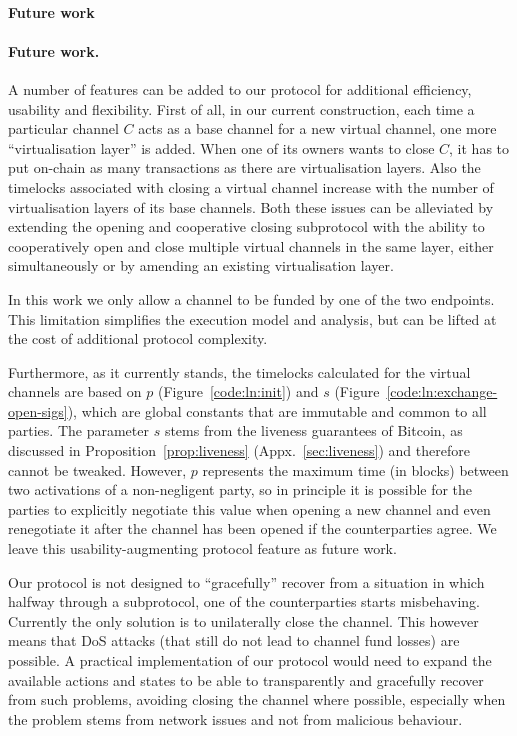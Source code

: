 \makeatletter%
%
  {\paragraph{Future work}}%
  {\paragraph{Future work.}}%
\makeatother%
  A number of features can be added to our protocol for additional efficiency,
  usability and flexibility. First of all, in our current construction, each
  time a particular channel $C$ acts as a base
  channel for a new virtual channel, one more ``virtualisation layer'' is added. When
  one of its owners wants to close $C$, it has to put on-chain as many
  transactions as there are virtualisation layers. Also the timelocks associated
  with closing a virtual channel increase with the number of virtualisation
  layers of its base channels. Both these issues can be alleviated by extending
  the opening and cooperative closing subprotocol with the ability to
  cooperatively open and close multiple virtual channels in the same layer,
  either simultaneously or by amending an existing virtualisation layer.

  In this work we only allow a channel to be funded by one of the two endpoints.
  This limitation simplifies the execution model and analysis, but can be lifted
  at the cost of additional protocol complexity.

  Furthermore, as it currently stands, the
  timelocks calculated for the virtual channels are based on $p$
  (Figure~\ref{code:ln:init}) and $s$ (Figure~\ref{code:ln:exchange-open-sigs}),
  which are global constants that are immutable and common to all parties. The
  parameter $s$ stems from the liveness guarantees of Bitcoin, as discussed in
  Proposition~\ref{prop:liveness} (Appx.~\ref{sec:liveness}) and therefore cannot be tweaked. However, $p$
  represents the maximum time (in blocks) between two activations of a
  non-negligent party, so in principle it is possible for the parties to
  explicitly negotiate this value when opening a new channel and even
  renegotiate it after the channel has been opened if the counterparties agree.
  We leave this usability-augmenting protocol feature as future work.

  Our protocol is not designed to ``gracefully'' recover from a situation in
  which halfway through a subprotocol, one of the counterparties starts
  misbehaving. Currently the only solution is to unilaterally close the channel.
  This however means that DoS attacks (that still do not lead to channel fund
  losses) are possible. A practical implementation of our protocol would need to
  expand the available actions and states to be able to transparently and
  gracefully recover from such problems, avoiding closing the channel where
  possible, especially when the problem stems from network issues and not from
  malicious behaviour.

